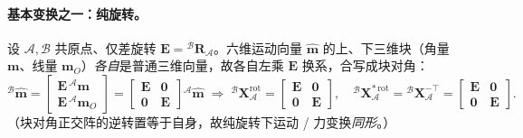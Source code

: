 \paragraph{基本变换之一：纯旋转。}
设 $\mathcal{A},\mathcal{B}$ 共原点、仅差旋转 $\mathbf{E}={}^{\mathcal{B}}\mathbf{R}_{\mathcal{A}}$。六维运动向量 $\hat{\boldsymbol{m}}$ 的上、下三维块（角量 $\boldsymbol{m}$、线量 $\boldsymbol{m}_O$）\emph{各自}是普通三维向量，故各自左乘 $\mathbf{E}$ 换系，合写成块对角\cite{yu2021quadruped}：
\begin{equation}
  {}^{\mathcal{B}}\hat{\boldsymbol{m}}
  =\begin{bmatrix}\mathbf{E}\,{}^{\mathcal{A}}\boldsymbol{m}\\ \mathbf{E}\,{}^{\mathcal{A}}\boldsymbol{m}_O\end{bmatrix}
  =\begin{bmatrix}\mathbf{E}&\mathbf{0}\\\mathbf{0}&\mathbf{E}\end{bmatrix}{}^{\mathcal{A}}\hat{\boldsymbol{m}}
  \;\Rightarrow\;
  {}^{\mathcal{B}}\mathbf{X}_{\mathcal{A}}^{\text{rot}}=\begin{bmatrix}\mathbf{E}&\mathbf{0}\\\mathbf{0}&\mathbf{E}\end{bmatrix},
  \quad
  {}^{\mathcal{B}}\mathbf{X}_{\mathcal{A}}^{*\,\text{rot}}={}^{\mathcal{B}}\mathbf{X}_{\mathcal{A}}^{-\top}=\begin{bmatrix}\mathbf{E}&\mathbf{0}\\\mathbf{0}&\mathbf{E}\end{bmatrix}.
  \label{eq:qk-plucker-rot}
\end{equation}
（块对角正交阵的逆转置等于自身，故纯旋转下运动 / 力变换\emph{同形}。）

